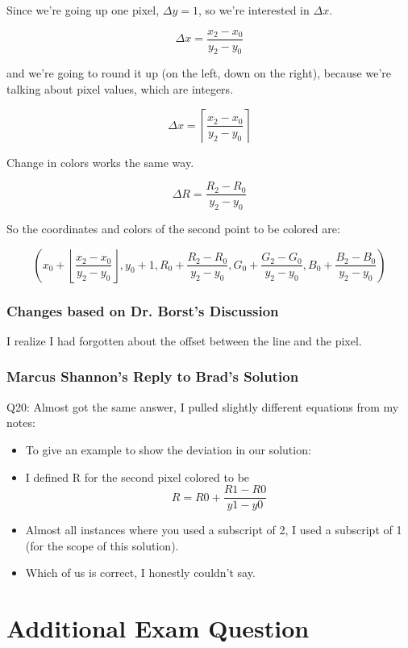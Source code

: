 \documentclass[11pt]{article}
\begin{document}
\begin{spacing}{1.2}
Since we're going up one pixel, $\Delta y = 1$, so we're interested in $\Delta x$.  

$$\Delta x = \frac{x_2 - x_0}{y_2 - y_0}$$

and we're going to round it up (on the left, down on the right), because we're talking about pixel values, which are integers.  

$$\Delta x = \left\lceil\frac{x_2 - x_0}{y_2 - y_0}\right\rceil$$

Change in colors works the same way.  

$$\Delta R = \frac{R_2 - R_0}{y_2 - y_0}$$

So the coordinates and colors of the second point to be colored are:

$$\left( x_0 + \left\lfloor\frac{x_2 - x_0}{y_2 - y_0}\right\rfloor, 
y_0 + 1, 
R_0 + \frac{R_2 - R_0}{y_2 - y_0},
G_0 + \frac{G_2 - G_0}{y_2 - y_0},
B_0 + \frac{B_2 - B_0}{y_2 - y_0}
\right)$$

\subsubsection{Changes based on Dr. Borst's Discussion}

I realize I had forgotten about the offset between the line and the pixel.  

\subsubsection{Marcus Shannon's Reply to Brad's Solution}

Q20: Almost got the same answer, I pulled slightly different equations from my notes:
\begin{itemize}
    \item To give an example to show the deviation in our solution:
      \item I defined R for the second pixel colored to be
          $$R = R0 + \frac{R1 - R0}{y1 - y0}$$
    \item Almost all instances where you used a subscript of 2, I used a subscript of 1 (for the scope of this solution).
    \item Which of us is correct, I honestly couldn't say.
\end{itemize}

\section{Additional Exam Question}


\end{spacing}
\end{document}
